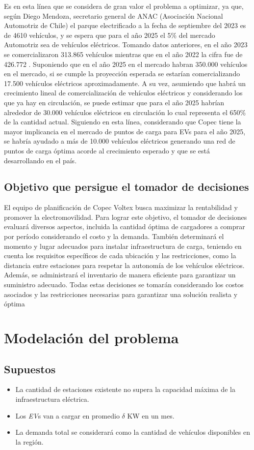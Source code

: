 \documentclass[letterpaper]{article}
\begin{document}
\begin{flushleft}
	Es en esta línea que se considera de gran valor el problema a optimizar, ya que, según Diego Mendoza, secretario general de ANAC (Asociación Nacional Automotriz de Chile) el parque electrificado a la fecha de septiembre del 2023 es de 4610 vehículos, y se espera que para el año 2025 el 5\% del mercado Automotriz sea de vehículos eléctricos. Tomando datos anteriores, en el año 2023 se comercializaron 313.865 vehículos \cite{chileautos} mientras que en el año 2022 la cifra fue de 426.772 \cite{Tercera-1}. Suponiendo que en el año 2025 en el mercado habran 350.000 vehículos en el mercado, si se cumple la proyección esperada se estarían comercializando 17.500 vehículos eléctricos aproximadamente. A su vez, asumiendo que habr\'a un crecimiento lineal de comercializaci\'on de veh\'iculos el\'ectricos y considerando los que ya hay en circulaci\'on, se puede estimar que para el año 2025 habr\'ian alrededor de 30.000 vehículos eléctricos en circulación lo cual representa el 650\% de la cantidad actual. Siguiendo en esta línea, considerando que Copec tiene la mayor implicancia en el mercado de puntos de carga para EVs para el año 2025, se habr\'ia ayudado a más de 10.000 vehículos eléctricos generando una red de puntos de carga óptima acorde al crecimiento esperado y que se está desarrollando en el país.
	\subsection{Objetivo que persigue el tomador de decisiones}
	El equipo de planificación de Copec Voltex busca maximizar la rentabilidad y promover la electromovilidad. Para lograr este objetivo, el tomador de decisiones evaluará diversos aspectos, incluida la cantidad óptima de cargadores a comprar por período considerando el costo y la demanda. También determinará el momento y lugar adecuados para instalar infraestructura de carga, teniendo en cuenta los requisitos específicos de cada ubicación y las restricciones, como la distancia entre estaciones para respetar la autonomía de los vehículos eléctricos. Además, se administrará el inventario de manera eficiente para garantizar un suministro adecuado. Todas estas decisiones se tomarán considerando los costos asociados y las restricciones necesarias para garantizar una solución realista y óptima
	
	\section{Modelación del problema}
	\subsection*{Supuestos}
	\begin{itemize}
		\item La cantidad de estaciones existente no supera la capacidad máxima de la infraestructura eléctrica.
		\item Los \textit{EV}s van a cargar en promedio $\delta$ KW en un mes.
		\item La demanda total se considerar\'a como la cantidad de veh\'iculos disponibles en la regi\'on.
	\end{itemize}

\end{flushleft}
\end{document}
